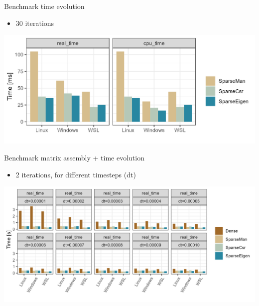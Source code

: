 \documentclass[aspectratio=169,xcolor=dvipsnames]{beamer}
\begin{document}
\begin{frame}{Benchmark time evolution}
   
    \begin{itemize}
        \item 30 iterations
    \end{itemize}
    
    \begin{center}
   \includegraphics[width=0.8\linewidth]{timeevolution_bench_result2.png}
   \end{center}
   
\end{frame}


\begin{frame}{Benchmark matrix assembly + time evolution}
   
    \begin{itemize}
        \item 2 iterations, for different timesteps (dt)
    \end{itemize}
    
    \begin{center}
   \includegraphics[width=1\linewidth]{ode_bench_result.png}
   \end{center}
   
\end{frame}

\end{document}
